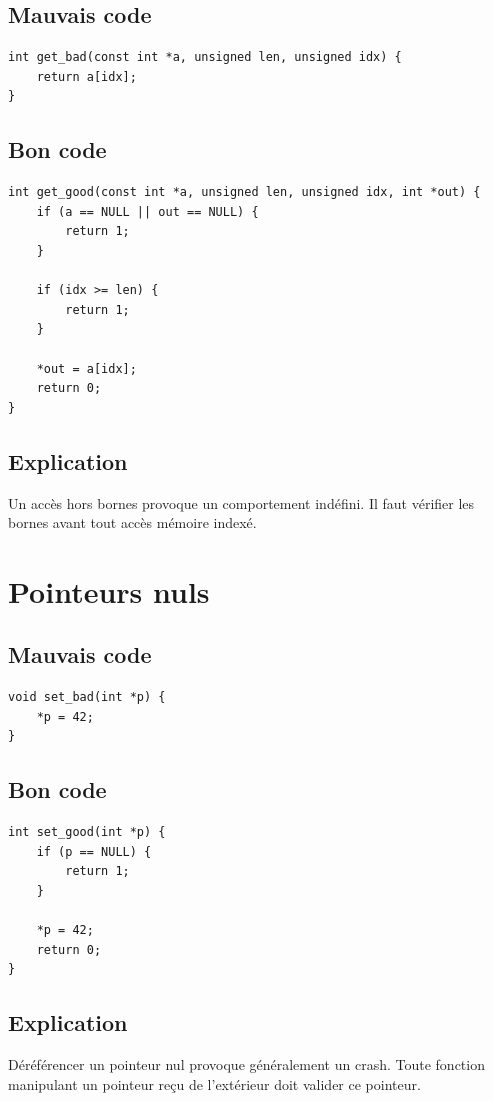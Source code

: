 \documentclass[a4paper,11pt]{report}
\begin{document}
\section{Mauvais code}
\begin{lstlisting}
int get_bad(const int *a, unsigned len, unsigned idx) {
    return a[idx];
}
\end{lstlisting}

\section{Bon code}
\begin{lstlisting}
int get_good(const int *a, unsigned len, unsigned idx, int *out) {
    if (a == NULL || out == NULL) {
        return 1;
    }

    if (idx >= len) {
        return 1;
    }

    *out = a[idx];
    return 0;
}
\end{lstlisting}

\section{Explication}
Un accès hors bornes provoque un comportement indéfini.
Il faut vérifier les bornes avant tout accès mémoire indexé.

\chapter{Pointeurs nuls}

\section{Mauvais code}
\begin{lstlisting}
void set_bad(int *p) {
    *p = 42;
}
\end{lstlisting}

\section{Bon code}
\begin{lstlisting}
int set_good(int *p) {
    if (p == NULL) {
        return 1;
    }

    *p = 42;
    return 0;
}
\end{lstlisting}

\section{Explication}
Déréférencer un pointeur nul provoque généralement un crash.
Toute fonction manipulant un pointeur reçu de l'extérieur doit valider ce pointeur.
\end{document}
